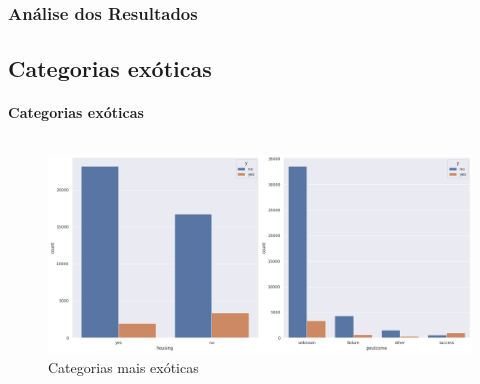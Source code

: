 \documentclass{beamer}
\begin{document}
\begin{frame}
	\frametitle{Análise dos Resultados}
    \subsection{Categorias exóticas}
	\framesubtitle{Categorias exóticas}
	\begin{columns}
		\begin{column}{1\textwidth}
			\begin{figure}[H]
				\centerline{\includegraphics[width=1.0\textwidth]{IMGS/analise1.png}}
				
				\caption{\label{fig:analise1}Categorias mais exóticas}
			\end{figure}
		\end{column}
	\end{columns}    
\end{frame}
\end{document}
